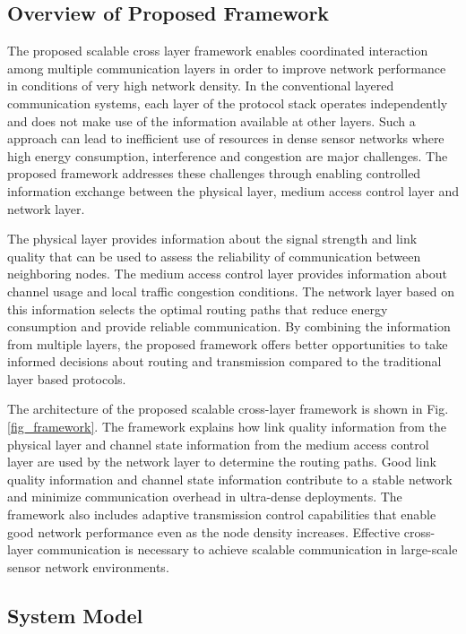 \documentclass[a4paper,fleqn]{cas-dc}
\numberwithin{equation}{section}
\begin{document}
\subsection{Overview of Proposed Framework}

The proposed scalable cross layer framework enables coordinated interaction among multiple communication layers in order to improve network performance in conditions of very high network density. In the conventional layered communication systems, each layer of the protocol stack operates independently and does not make use of the information available at other layers. Such a approach can lead to inefficient use of resources in dense sensor networks where high energy consumption, interference and congestion are major challenges. The proposed framework addresses these challenges through enabling controlled information exchange between the physical layer, medium access control layer and network layer.

The physical layer provides information about the signal strength and link quality that can be used to assess the reliability of communication between neighboring nodes. The medium access control layer provides information about channel usage and local traffic congestion conditions. The network layer based on this information selects the optimal routing paths that reduce energy consumption and provide reliable communication. By combining the information from multiple layers, the proposed framework offers better opportunities to take informed decisions about routing and transmission compared to the traditional layer based protocols.

The architecture of the proposed scalable cross-layer framework is shown in Fig. \ref{fig_framework}. The framework explains how link quality information from the physical layer and channel state information from the medium access control layer are used by the network layer to determine the routing paths. Good link quality information and channel state information contribute to a stable network and minimize communication overhead in ultra-dense deployments. The framework also includes adaptive transmission control capabilities that enable good network performance even as the node density increases. Effective cross-layer communication is necessary to achieve scalable communication in large-scale sensor network environments.

\subsection{System Model}
\end{document}
